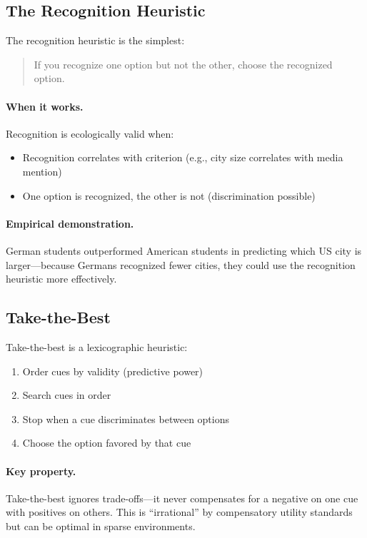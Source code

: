 \subsection{The Recognition Heuristic}

The recognition heuristic \citep{PAP-goldstein2002recognition} is the simplest:
\begin{quote}
If you recognize one option but not the other, choose the recognized option.
\end{quote}

\paragraph{When it works.} Recognition is ecologically valid when:
\begin{itemize}[nosep]
\item Recognition correlates with criterion (e.g., city size correlates with media mention)
\item One option is recognized, the other is not (discrimination possible)
\end{itemize}

\paragraph{Empirical demonstration.} German students outperformed American students in predicting which US city is larger---because Germans recognized fewer cities, they could use the recognition heuristic more effectively.

\subsection{Take-the-Best}

Take-the-best \citep{PAP-gigerenzer1996fast} is a lexicographic heuristic:

\begin{enumerate}[nosep]
\item Order cues by validity (predictive power)
\item Search cues in order
\item Stop when a cue discriminates between options
\item Choose the option favored by that cue
\end{enumerate}

\paragraph{Key property.} Take-the-best ignores trade-offs---it never compensates for a negative on one cue with positives on others. This is ``irrational'' by compensatory utility standards but can be optimal in sparse environments.

